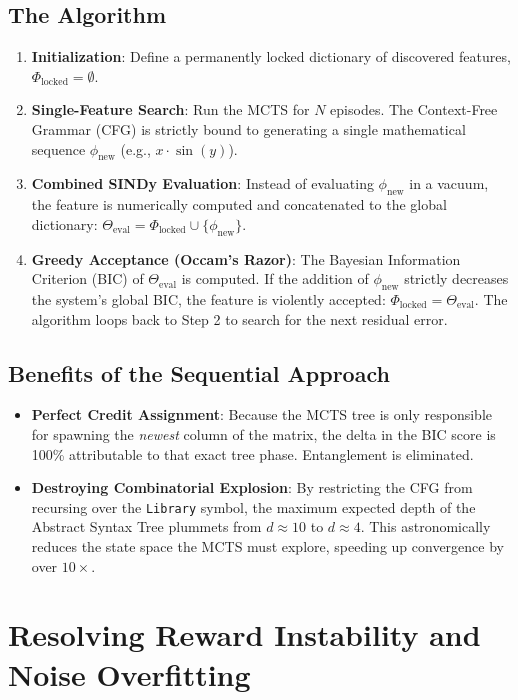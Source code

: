 \documentclass[11pt, a4paper]{article}
\begin{document}
\subsection{The Algorithm}
\begin{enumerate}
    \item \textbf{Initialization}: Define a permanently locked dictionary of discovered features, $\Phi_{\text{locked}} = \emptyset$.
    \item \textbf{Single-Feature Search}: Run the MCTS for $N$ episodes. The Context-Free Grammar (CFG) is strictly bound to generating a single mathematical sequence $\phi_{\text{new}}$ (e.g., $x \cdot \sin(y)$).
    \item \textbf{Combined SINDy Evaluation}: Instead of evaluating $\phi_{\text{new}}$ in a vacuum, the feature is numerically computed and concatenated to the global dictionary: $\Theta_{\text{eval}} = \Phi_{\text{locked}} \cup \{\phi_{\text{new}}\}$. 
    \item \textbf{Greedy Acceptance (Occam's Razor)}: The Bayesian Information Criterion (BIC) of $\Theta_{\text{eval}}$ is computed. If the addition of $\phi_{\text{new}}$ strictly decreases the system's global BIC, the feature is violently accepted: $\Phi_{\text{locked}} = \Theta_{\text{eval}}$. The algorithm loops back to Step 2 to search for the next residual error.
\end{enumerate}

\subsection{Benefits of the Sequential Approach}
\begin{itemize}
    \item \textbf{Perfect Credit Assignment}: Because the MCTS tree is only responsible for spawning the \textit{newest} column of the matrix, the delta in the BIC score is 100\% attributable to that exact tree phase. Entanglement is eliminated.
    \item \textbf{Destroying Combinatorial Explosion}: By restricting the CFG from recursing over the \texttt{Library} symbol, the maximum expected depth of the Abstract Syntax Tree plummets from $d \approx 10$ to $d \approx 4$. This astronomically reduces the state space the MCTS must explore, speeding up convergence by over $10\times$.
\end{itemize}

\section{Resolving Reward Instability and Noise Overfitting}
\end{document}
